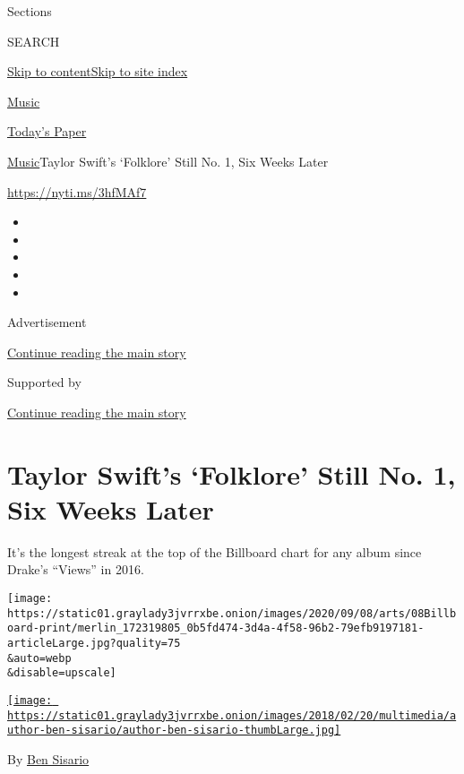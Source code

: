 Sections

SEARCH

\protect\hyperlink{site-content}{Skip to
content}\protect\hyperlink{site-index}{Skip to site index}

\href{https://www.nytimes3xbfgragh.onion/section/arts/music}{Music}

\href{https://myaccount.nytimes3xbfgragh.onion/auth/login?response_type=cookie\&client_id=vi}{}

\href{https://www.nytimes3xbfgragh.onion/section/todayspaper}{Today's
Paper}

\href{/section/arts/music}{Music}\textbar{}Taylor Swift's `Folklore'
Still No. 1, Six Weeks Later

\url{https://nyti.ms/3hfMAf7}

\begin{itemize}
\item
\item
\item
\item
\item
\end{itemize}

Advertisement

\protect\hyperlink{after-top}{Continue reading the main story}

Supported by

\protect\hyperlink{after-sponsor}{Continue reading the main story}

\hypertarget{taylor-swifts-folklore-still-no-1-six-weeks-later}{%
\section{Taylor Swift's `Folklore' Still No. 1, Six Weeks
Later}\label{taylor-swifts-folklore-still-no-1-six-weeks-later}}

It's the longest streak at the top of the Billboard chart for any album
since Drake's ``Views'' in 2016.

\texttt{[image: https://static01.graylady3jvrrxbe.onion/images/2020/09/08/arts/08Billboard-print/merlin\_172319805\_0b5fd474-3d4a-4f58-96b2-79efb9197181-articleLarge.jpg?quality=75\\\&auto=webp\\\&disable=upscale]}

\href{https://www.nytimes3xbfgragh.onion/by/ben-sisario}{\texttt{[image: https://static01.graylady3jvrrxbe.onion/images/2018/02/20/multimedia/author-ben-sisario/author-ben-sisario-thumbLarge.jpg]}}

By \href{https://www.nytimes3xbfgragh.onion/by/ben-sisario}{Ben Sisario}

